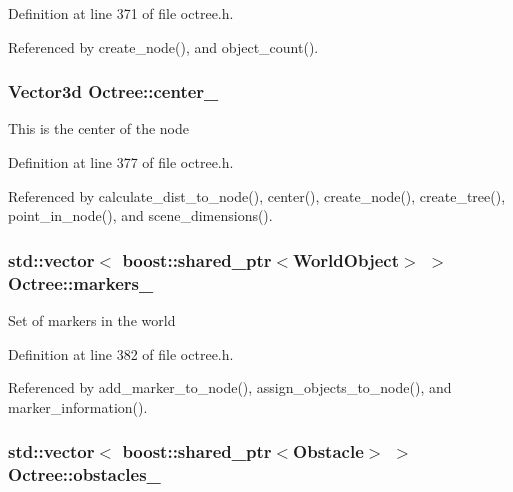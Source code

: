Definition at line 371 of file octree.h.

Referenced by create\_\-node(), and object\_\-count().\hypertarget{class_octree_d1830408734e4435f934a6cb31a0c8a4}{
\subsubsection[center\_\-]{\setlength{\rightskip}{0pt plus 5cm}Vector3d {\bf Octree::center\_\-}}}
\label{class_octree_d1830408734e4435f934a6cb31a0c8a4}


This is the center of the node 

Definition at line 377 of file octree.h.

Referenced by calculate\_\-dist\_\-to\_\-node(), center(), create\_\-node(), create\_\-tree(), point\_\-in\_\-node(), and scene\_\-dimensions().\hypertarget{class_octree_420b03d97b1631a2809b3b4929a84e89}{
\subsubsection[markers\_\-]{\setlength{\rightskip}{0pt plus 5cm}std::vector$<$ boost::shared\_\-ptr$<${\bf WorldObject}$>$ $>$ {\bf Octree::markers\_\-}}}
\label{class_octree_420b03d97b1631a2809b3b4929a84e89}


Set of markers in the world 

Definition at line 382 of file octree.h.

Referenced by add\_\-marker\_\-to\_\-node(), assign\_\-objects\_\-to\_\-node(), and marker\_\-information().\hypertarget{class_octree_7ba27f0c60cc3eceb10799bcc43e8acf}{
\subsubsection[obstacles\_\-]{\setlength{\rightskip}{0pt plus 5cm}std::vector$<$ boost::shared\_\-ptr$<$Obstacle$>$ $>$ {\bf Octree::obstacles\_\-}}}
\label{class_octree_7ba27f0c60cc3eceb10799bcc43e8acf}


